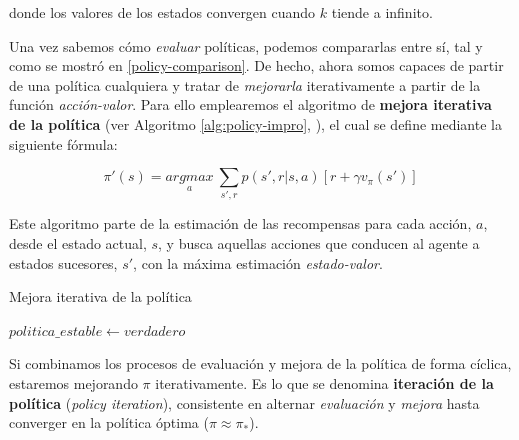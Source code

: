 donde los valores de los estados convergen cuando $k$ tiende a infinito. 

Una vez sabemos cómo \textit{evaluar} políticas, podemos compararlas entre sí, tal y como se mostró en \ref{policy-comparison}. De hecho, ahora somos capaces de partir de una política cualquiera y tratar de \textit{mejorarla} iterativamente a partir de la función \textit{acción-valor}. Para ello emplearemos el algoritmo de \textbf{mejora iterativa de la política} (ver Algoritmo \ref{alg:policy-impro}, \cite{sutton2018reinforcement}), el cual se define mediante la siguiente fórmula:

\begin{equation}
    \pi'(s) = \underset{a}{argmax}\ \sum_{s',r}p(s', r | s, a)[r + \gamma v_\pi(s')]
\end{equation}

Este algoritmo parte de la estimación de las recompensas para cada acción, $a$, desde el estado actual, $s$, y busca aquellas acciones que conducen al agente a estados sucesores, $s'$, con la máxima estimación \textit{estado-valor}.

\begin{algorithm}
\caption{Mejora iterativa de la política}
\label{alg:policy-impro}
\DontPrintSemicolon
\LinesNumbered
{}

    $politica\_estable \leftarrow verdadero$\;

\end{algorithm}

Si combinamos los procesos de evaluación y mejora de la política de forma cíclica, estaremos mejorando $\pi$ iterativamente. Es lo que se denomina \textbf{iteración de la política} (\textit{policy iteration}), consistente en alternar \textit{evaluación} y \textit{mejora} hasta converger en la política óptima ($\pi \approx \pi_*$).

